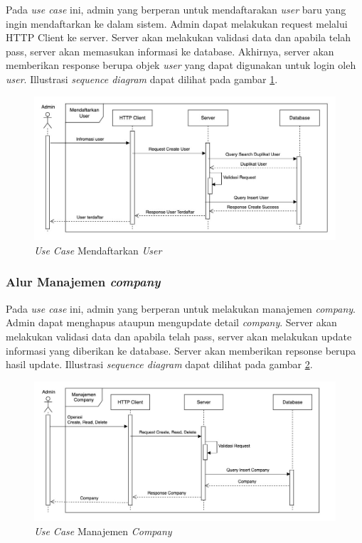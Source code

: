Pada \textit{use case} ini, admin yang berperan untuk mendaftarakan \textit{user} baru yang ingin mendaftarkan ke dalam sistem. Admin dapat melakukan request melalui HTTP Client ke server. Server akan melakukan validasi data dan apabila telah pass, server akan memasukan informasi ke database. Akhirnya, server akan memberikan response berupa objek \textit{user} yang dapat digunakan untuk login oleh \textit{user}. Illustrasi \textit{sequence diagram} dapat dilihat pada gambar \ref{fig:usecase-02}.

\begin{figure}[ht]
  \centering
  \includegraphics[width=1\textwidth]{resources/chapter-3/usecase/uc-02.jpg}
  \caption{\textit{Use Case} Mendaftarkan \textit{User}}
  \label{fig:usecase-02}
\end{figure}

\subsubsection{Alur Manajemen \textit{company}}

Pada \textit{use case} ini, admin yang berperan untuk melakukan manajemen \textit{company}. Admin dapat menghapus ataupun mengupdate detail \textit{company}. Server akan melakukan validasi data dan apabila telah pass, server akan melakukan update informasi yang diberikan ke database. Server akan memberikan repsonse berupa hasil update. Illustrasi \textit{sequence diagram} dapat dilihat pada gambar \ref{fig:usecase-03}.

\begin{figure}[ht]
  \centering
  \includegraphics[width=1\textwidth]{resources/chapter-3/usecase/uc-03.jpg}
  \caption{\textit{Use Case} Manajemen \textit{Company}}
  \label{fig:usecase-03}
\end{figure}

